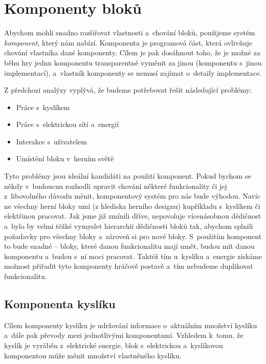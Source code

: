


\section{Komponenty bloků}
\label{sec:komponents}

Abychom mohli snadno rozšiřovat vlastnosti a~chování bloků, použijeme systém \textit{komponent}, který nám \UE{} nabízí. Komponenta je programová část, která ovlivňuje chování vlastníka dané komponenty. Cílem je pak dosáhnout toho, že je možné za běhu hry jednu komponentu transparentně vyměnit za jinou (komponentu s~jinou implementací), a~vlastník komponenty se nemusí zajímat o~detaily implementace.

Z předchozí analýzy vyplývá, že budeme potřebovat řešit následující problémy:

\begin{itemize}
	\item Práce s~kyslíkem
	\item Práce s~elektrickou sítí a~energií
	\item Interakce s~uživatelem
	\item Umístění bloku v~herním světě
\end{itemize}


Tyto problémy jsou ideální kandidáti na použití komponent. Pokud bychom se někdy v~budoucnu rozhodli upravit chování některé funkcionality či jej z~libovolného důvodu měnit, komponentový systém pro nás bude výhodou. Navíc ne všechny herní bloky umí (z hlediska herního designu) kupříkladu s~kyslíkem či elektřinou pracovat. Jak jsme již zmínili dříve, \UE{} nepovoluje vícenásobnou dědičnost a~bylo by velmi těžké vymyslet hierarchii dědičnosti bloků tak, abychom splnili požadavky pro všechny bloky a~zároveň si  pro nové bloky. S~použitím komponent to bude snadné -- bloky, které danou funkcionalitu mají umět, budou mít danou komponentu a~budou s~ní moci pracovat. Taktéž tím u~kyslíku a~energie získáme možnost přiřadit tyto komponenty hráčově postavě a~tím nebudeme duplikovat funkcionalitu.

\subsection{Komponenta kyslíku}

Cílem komponenty kyslíku je udržování informace o~aktuálním množství \linebreak {} kyslíku a~dále pak převody mezi jednotlivými komponentami. Vzhledem k~tomu, že kyslík je vyráběn z~elektrické energie, blok s~elektrickou a~kyslíkovou komponentou může měnit množství vlastněného kyslíku. 

